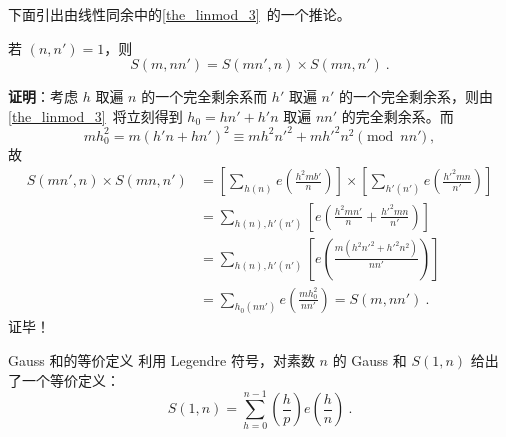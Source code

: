 下面引出由线性同余中的\autoref{the_linmod_3}~的一个推论。
\begin{corollary}{}
若 $(n, n') = 1$，则
\begin{equation}
S(m, nn') = S(mn', n) \times S(mn, n') ~.
\end{equation}

\end{corollary}
\textbf{证明}：考虑 $h$ 取遍 $n$ 的一个完全剩余系而 $h'$ 取遍 $n'$ 的一个完全剩余系，则由\autoref{the_linmod_3}~将立刻得到 $h_0 = hn' +h'n$ 取遍 $nn'$ 的完全剩余系。而
\begin{equation}
mh_0^2 = m(h'n + hn')^2 \equiv mh^2n'^2 + mh'^2n^2 \pmod{nn'} ~,
\end{equation}
故
\begin{equation}
\begin{aligned}
S(mn', n) \times S(mn, n') &= \left[ \sum_{h(n)} e\left(\frac{h^2mb'}{n}\right) \right] \times \left[\sum_{h'(n')} e\left(\frac{h'^2mn}{n'}\right)\right] \\
&= \sum_{h(n), h'(n')} \left[ e\left(\frac{h^2 mn'}{n} + \frac{h'^2 mn}{n'}\right)\right] \\
&= \sum_{h(n), h'(n')} \left[ e\left( \frac{m(h^2 n'^2 + h'^2 n^2)}{nn'} \right)\right]\\
&= \sum_{h_0(nn')} e\left( \frac{m h_0^2}{nn'} \right) = S(m, nn')~.
\end{aligned}
\end{equation}
证毕！

\begin{theorem}{Gauss 和的等价定义}
利用 Legendre 符号，对素数 $n$ 的 Gauss 和 $S(1, n)$ 给出了一个等价定义：
\begin{equation}
S(1, n) = \sum_{h=0}^{n-1} \left(\frac hp\right) e\left(\frac{h}{n}\right) ~.
\end{equation}

\end{theorem}